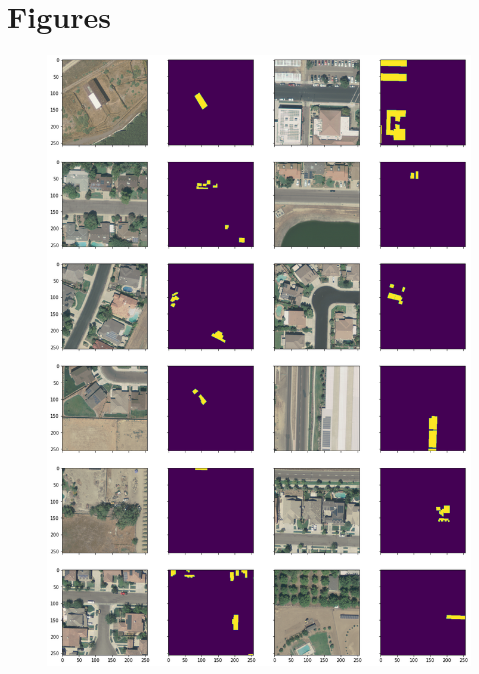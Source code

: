 \documentclass[a4paper, 12pt]{article}
\begin{document}
\newpage

\printbibliography

\appendix

\section{Figures}

\begin{figure}
    \centering
    \includegraphics[width=\textwidth]{resources/png/masks.png}
    \label{fig:masks}
\end{figure}
\end{document}
